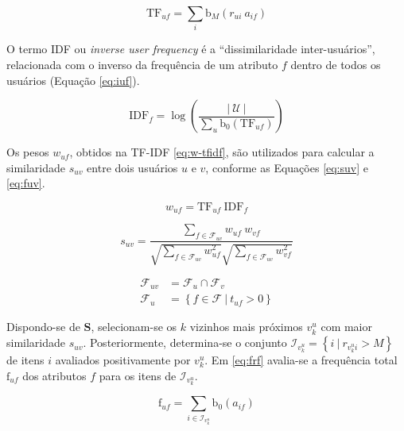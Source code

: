 \begin{equation}
\label{eq:tf} 
    \mathrm{TF}_{uf}  = \sum_{i}{\mathrm{b}_M\left(r_{ui}~a_{if}\right)} 
\end{equation} 

O termo IDF ou \textit{inverse user frequency} é a ``dissimilaridade inter-usuários'', relacionada com o inverso da frequência de um atributo $f$ dentro de todos os usuários (Equação \ref{eq:iuf}).

\begin{equation}
\label{eq:iuf} 
    \mathrm{IDF}_{f} = \log \left( \frac{\left|~\mathcal{U}~\right|}{\sum_{u}{\mathrm{b}_0\left(\mathrm{TF}_{uf}\right)}} \right)
\end{equation} 

Os pesos $w_{uf}$, obtidos na TF-IDF \ref{eq:w-tfidf}, são utilizados para calcular a similaridade $s_{uv}$ entre dois usuários $u$ e $v$, conforme as Equações \ref{eq:suv} e \ref{eq:fuv}.

\begin{equation}
\label{eq:w-tfidf} 
    w_{uf} = \mathrm{TF}_{uf}~\mathrm{IDF}_{f}
\end{equation} 


\begin{equation}
\label{eq:suv}
    s_{uv} = \frac{\sum\limits_{f \in \mathcal{F}_{uv}}{w_{uf}~w_{vf}}}{\sqrt{\sum\limits_{f \in \mathcal{F}_{uv}
    }w_{uf}^2} \sqrt{\sum\limits_{f \in \mathcal{F}_{uv}}w_{vf}^2}} 
\end{equation} 

\begin{equation}
\label{eq:fuv}
\begin{split}
    \mathcal{F}_{uv} &= \mathcal{F}_u \cap \mathcal{F}_v \\
    \mathcal{F}_u &= \left\{ f \in \mathcal{F}~|~t_{uf} > 0 \right\}
\end{split}    
\end{equation} 

Dispondo-se de $\mathbf{S}$, selecionam-se os $k$ vizinhos mais próximos $v_k^u$ com maior similaridade $s_{uv}$.  Posteriormente, determina-se o conjunto $\mathcal{I}_{v_k^u} = \left\{ i ~|~ r_{v_k^u i} > M\right\}$ de itens $i$ avaliados positivamente por $v_k^u$. Em \ref{eq:frf} avalia-se a frequência total $\mathrm{f}_{uf}$ dos atributos $f$ para os itens de $\mathcal{I}_{v_k^u}$. 

\begin{equation}
\label{eq:frf} 
\mathrm{f}_{uf} = \sum_{i \in \mathcal{I}_{v_k^u}}{\mathrm{b}_0\left(a_{if}\right)}
\end{equation} 

